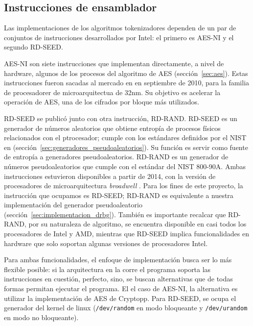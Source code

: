 \subsection{Instrucciones de ensamblador}
\label{sec:intel}

Las implementaciones de los algoritmos tokenizadores dependen de un par de
conjuntos de instrucciones desarrollados por Intel: el primero es AES-NI y el
segundo RD-SEED.

AES-NI son siete instrucciones que implementan directamente, a nivel de
hardware, algunos de los procesos del algoritmo de AES (sección~\ref{sec:aes}).
Estas instrucciones fueron sacadas al mercado en en septiembre de 2010, para la
familia de procesadorer de microarquitectua de 32nm\cite{aesni_wp}. Su objetivo
es acelerar la operación de AES, una de los cifrados por bloque más
utilizados.

RD-SEED se publicó junto con otra instrucción, RD-RAND. RD-SEED es un generador
de números aleatorios que obtiene entropía de procesos físicos relacionados con
el ptrocesador; cumple con los estándares definidos por el NIST en
\cite{nist_aleatorios} (sección~\ref{sec:generadores_pseudoaleatorios}). Su
función es servir como fuente de entropía a generadores pseudoaleatorios.
RD-RAND es un generador de números pseudoaleatorios que cumple con el estándar
del NIST 800-90A. Ambas instrucciones estuvieron disponibles a partir de 2014,
con la versión de procesadores de microarquitectura \textit{broadwell}
\cite{aesni_wp}. Para los fines de este proyecto, la instrucción que ocupamos
es RD-SEED; RD-RAND es equivalente a nuestra implementación del generador
pseudoaleatorio (sección~\ref{sec:implementacion_drbg}). También es importante
recalcar que RD-RAND, por su naturaleza de algoritmo, se encuentra disponible en
casi todos los procesadores de Intel y AMD, mientras que RD-SEED implica
funcionalidades en hardware que solo soportan algunas versiones de procesadores
Intel.

Para ambas funcionalidades, el enfoque de implementación busca ser lo más
flexible posible: si la arquitectura en la corre el programa soporta las
instrucciones en cuestión, perfecto, sino, se buscan alternativas que de todas
formas permitan ejecutar el programa. El el caso de AES-NI, la alternativa es
utilizar la implementación de AES de Cryptopp. Para RD-SEED, se ocupa el
generador del kernel de linux (\texttt{/dev/random} en modo bloqueante y
\texttt{/dev/urandom} en modo no bloqueante).
